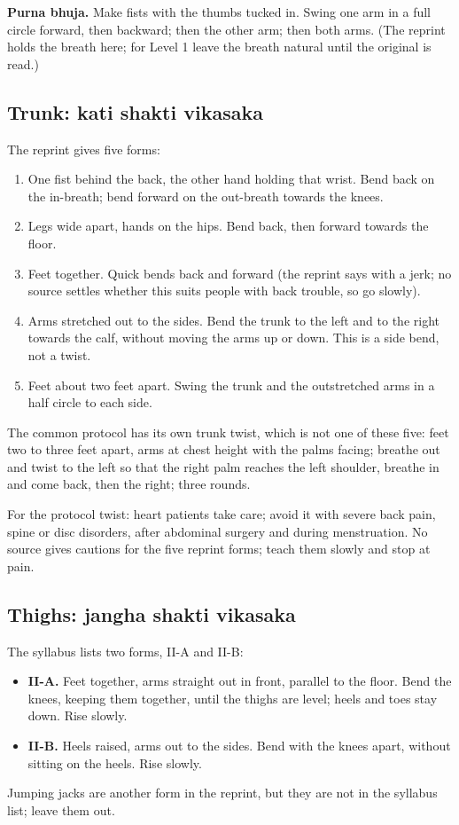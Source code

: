 \textbf{Purna bhuja.} Make fists with the thumbs tucked in. Swing one arm in a full circle forward, then backward; then the other arm; then both arms. (The reprint holds the breath here; for Level 1 leave the breath natural until the original is read.)


\subsection*{Trunk: kati shakti vikasaka}
The reprint gives five forms:
\begin{enumerate}
\item One fist behind the back, the other hand holding that wrist. Bend back on the in-breath; bend forward on the out-breath towards the knees.
\item Legs wide apart, hands on the hips. Bend back, then forward towards the floor.
\item Feet together. Quick bends back and forward (the reprint says with a jerk; no source settles whether this suits people with back trouble, so go slowly).
\item Arms stretched out to the sides. Bend the trunk to the left and to the right towards the calf, without moving the arms up or down. This is a side bend, not a twist.
\item Feet about two feet apart. Swing the trunk and the outstretched arms in a half circle to each side.
\end{enumerate}
The common protocol has its own trunk twist, which is not one of these five: feet two to three feet apart, arms at chest height with the palms facing; breathe out and twist to the left so that the right palm reaches the left shoulder, breathe in and come back, then the right; three rounds.

\begin{caution}
For the protocol twist: heart patients take care; avoid it with severe back pain, spine or disc disorders, after abdominal surgery and during menstruation. No source gives cautions for the five reprint forms; teach them slowly and stop at pain.
\end{caution}


\subsection*{Thighs: jangha shakti vikasaka}
The syllabus lists two forms, II-A and II-B:
\begin{itemize}
\item \textbf{II-A.} Feet together, arms straight out in front, parallel to the floor. Bend the knees, keeping them together, until the thighs are level; heels and toes stay down. Rise slowly.
\item \textbf{II-B.} Heels raised, arms out to the sides. Bend with the knees apart, without sitting on the heels. Rise slowly.
\end{itemize}
Jumping jacks are another form in the reprint, but they are not in the syllabus list; leave them out.

